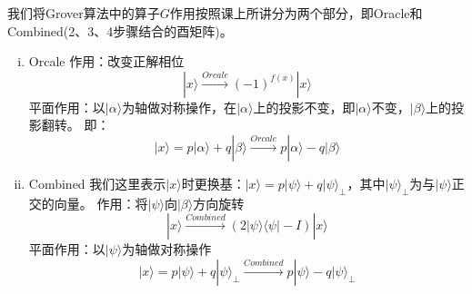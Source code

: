 \documentclass[11pt]{article}
\begin{document}
我们将Grover算法中的算子$G$作用按照课上所讲分为两个部分，即Oracle和Combined(2、3、4步骤结合的酉矩阵)。

\begin{enumerate}[i.]
    \item Orcale
    作用：改变正解相位
       \[|x\rangle \stackrel{Orcale}\longrightarrow  (-1)^{f(x)}|x\rangle\]
    平面作用：以$|\alpha\rangle$为轴做对称操作，在$|\alpha\rangle$上的投影不变，即$|\alpha\rangle$不变，$|\beta\rangle$上的投影翻转。
    即：
    \[|x\rangle = p |\alpha\rangle + q |\beta\rangle \stackrel{Orcale}\longrightarrow  p |\alpha\rangle - q|\beta\rangle\]
    \item Combined
    我们这里表示$|x\rangle$时更换基：$|x\rangle = p |\psi\rangle + q |\psi\rangle_\perp$，其中$|\psi\rangle_{\perp}$为与$|\psi\rangle$正交的向量。
    作用：将$|\psi\rangle$向$|\beta\rangle$方向旋转
    \[|x\rangle \stackrel{Combined}\longrightarrow \left(2|\psi\rangle\langle\psi| - I\right)|x\rangle\]   
    平面作用：以$|\psi\rangle$为轴做对称操作
    \[|x\rangle =  p |\psi\rangle + q |\psi\rangle_\perp \stackrel{Combined}\longrightarrow   p |\psi\rangle - q |\psi\rangle_\perp\]
\end{enumerate}
\end{document}
